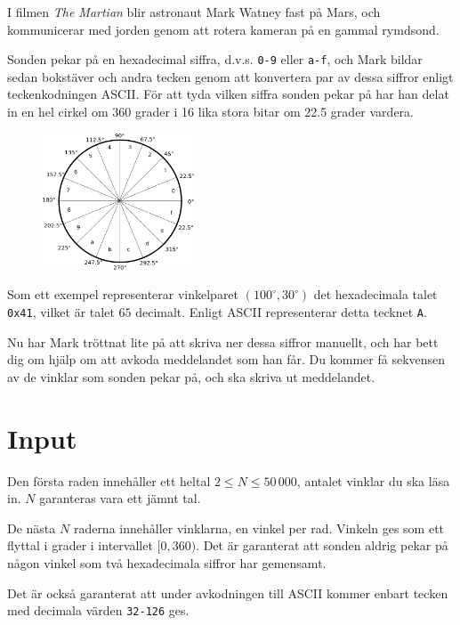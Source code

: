 
I filmen \emph{The Martian} blir astronaut Mark Watney fast på Mars, och kommunicerar med jorden genom att rotera
kameran på en gammal rymdsond.

Sonden pekar på en hexadecimal siffra, d.v.s. \texttt{0-9} eller \texttt{a-f}, och Mark bildar sedan bokstäver
och andra tecken genom att konvertera par av dessa siffror enligt teckenkodningen ASCII. För att tyda
vilken siffra sonden pekar på har han delat in en hel cirkel om 360 grader i 16 lika stora bitar om 22.5 grader
vardera.

\begin{figure}[h!]
  \begin{center}
    \includegraphics[width=0.4\textwidth]{angles.png}
  \end{center}
\end{figure}

Som ett exempel representerar vinkelparet $(100^{\circ}, 30^{\circ})$ det hexadecimala talet \texttt{0x41}, vilket är talet $65$ decimalt.
Enligt ASCII representerar detta tecknet \texttt{A}.

Nu har Mark tröttnat lite på att skriva ner dessa siffror manuellt, och har bett dig om hjälp om att avkoda meddelandet
som han får. Du kommer få sekvensen av de vinklar som sonden pekar på, och ska skriva ut meddelandet.

\section*{Input}
Den första raden innehåller ett heltal $2 \le N \le 50\,000$, antalet vinklar du ska läsa in. $N$ garanteras vara ett jämnt tal.

De nästa $N$ raderna innehåller vinklarna, en vinkel per rad. Vinkeln ges som ett flyttal i grader i intervallet $[0, 360)$.
Det är garanterat att sonden aldrig pekar på någon vinkel som två hexadecimala siffror har gemensamt.

Det är också garanterat att under avkodningen till ASCII kommer enbart tecken med decimala värden \texttt{32-126} ges.

